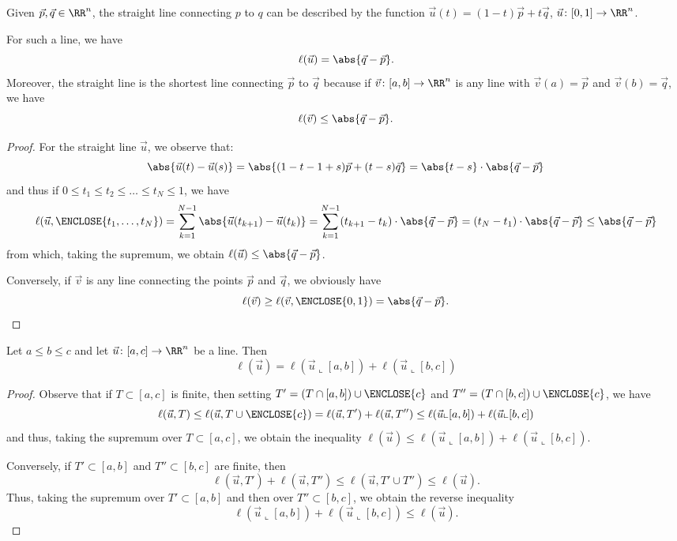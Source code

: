 \begin{theorem}
Given $\vec p, \vec q\in \RR^n$, the straight line connecting $p$ to $q$ can be
described by the function $\vec u(t) = (1-t) \vec p + t \vec q$, $\vec
u\colon[0,1]\to \RR^n$.

For such a line, we have 
\[
 \ell(\vec u) = \abs{\vec q- \vec p}.
\]
Moreover, the straight line is the shortest line connecting $\vec p$ to $\vec q$
because if $\vec v\colon[a,b]\to \RR^n$ is any line with $\vec v(a)=\vec p$ and
$\vec v(b)=\vec q$, we have
\[
\ell(\vec v) \le \abs{\vec q-\vec p}.  
\]
\end{theorem}
%
\begin{proof}
For the straight line $\vec u$, we observe that:
\[
  \abs{\vec u(t)-\vec u(s)} 
  = \abs{(1-t - 1+s)\vec p + (t-s)\vec q}
  = \abs{t-s}\cdot \abs{\vec q - \vec p}
\]
and thus if $0\le t_1\le t_2\le \dots \le t_N \le 1$, we have
\[
  \ell(\vec u, \ENCLOSE{t_1,\dots,t_N}) = 
  \sum_{k=1}^{N-1} \abs{\vec u(t_{k+1}) - \vec u(t_k)}
  = \sum_{k=1}^{N-1} (t_{k+1}-t_k)\cdot \abs{\vec q-\vec p}
  = (t_N-t_1)\cdot \abs{\vec q-\vec p}
  \le \abs{\vec q-\vec p}
\]
from which, taking the supremum, we obtain $\ell(\vec u)\le \abs{\vec q -\vec
p}$.

Conversely, if $\vec v$ is any line connecting the points $\vec p$ and $\vec q$,
we obviously have
\[
  \ell(\vec v) \ge \ell(\vec v,\ENCLOSE{0,1}) = \abs{\vec q - \vec p}.
\]
\end{proof}

\begin{theorem}
Let $a\le b \le c$ and let $\vec u\colon [a,c]\to \RR^n$ be a line. Then%
%
\begin{equation}\label{eq:ell_additivo}
\ell(\vec u ) = \ell(\vec u\llcorner[a,b]) + \ell(\vec u\llcorner[b,c])  
\end{equation}
\end{theorem}
\begin{proof}
Observe that if $T\subset[a,c]$ is finite, then setting
$T'=(T\cap[a,b])\cup\ENCLOSE{c}$ and $T''=(T\cap[b,c])\cup \ENCLOSE{c}$, we have
\[
\ell(\vec u, T) \le \ell(\vec u, T\cup\ENCLOSE{c})
=\ell(\vec u,T') + \ell(\vec u,T'')  
\le \ell(\vec u\llcorner [a,b]) + \ell(\vec u\llcorner [b,c])
\]
and thus, taking the supremum over $T\subset [a,c]$, we obtain the inequality
$\ell(\vec u)\le \ell(\vec u\llcorner [a,b]) + \ell(\vec u\llcorner[b,c])$.

Conversely, if $T'\subset [a,b]$ and $T''\subset [b,c]$ are finite, then 
\[
 \ell(\vec u, T') + \ell(\vec u, T'')
 \le \ell(\vec u, T'\cup T'') \le \ell(\vec u).
\]
Thus, taking the supremum over $T'\subset [a,b]$ and then over $T''\subset
[b,c]$, we obtain the reverse inequality
\[
  \ell(\vec u\llcorner[a,b]) + \ell(\vec u\llcorner[b,c])
  \le \ell(\vec u).
\]
\end{proof}


